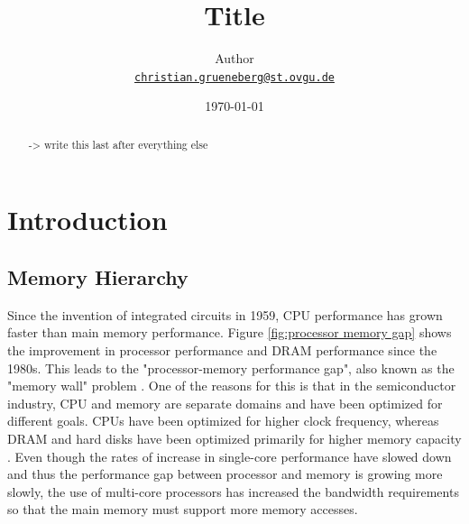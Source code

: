 \documentclass[
	12pt,
	a4paper,
	abstract,
	bibliography=totoc,
	chapterprefix,
	headings=openright,
	numbers=endperiod,
	parskip=half,
	twoside,
]{scrreprt}
\title{Title}
\author{
Author\\
{\large\href{mailto:christian.grueneberg@st.ovgu.de}{\nolinkurl{christian.grueneberg@st.ovgu.de}}}
}
\date{\today}
\begin{document}
{}

\maketitle

\begin{abstract}


-> write this last after everything else

\end{abstract}

\tableofcontents

\cleardoubleoddpage
{}

\chapter{Introduction}
\label{cha:introduction}



\section{Memory Hierarchy}
Since the invention of integrated circuits in 1959, CPU performance has grown faster than main memory performance.
Figure \ref{fig:processor memory gap} shows the improvement in processor performance and DRAM performance since the 1980s.
This leads to the "processor-memory performance gap", also known as the "memory wall" problem \cite{wulf1995hitting}.
One of the reasons for this is that in the semiconductor industry, CPU and memory are separate domains and have been optimized for different goals.
CPUs have been optimized for higher clock frequency, whereas DRAM and hard disks have been optimized primarily for higher memory capacity \cite{cpu-mem-gap}.
Even though the rates of increase in single-core performance have slowed down and thus the performance gap between processor and memory is growing more slowly, the use of multi-core processors has increased the bandwidth requirements so that the main memory must support more memory accesses.
\end{document}
